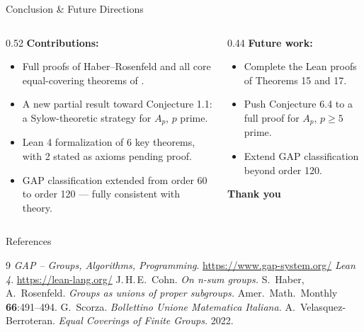 \documentclass[9pt,aspectratio=169]{beamer}
\begin{document}
\begin{frame}{Conclusion \& Future Directions}
\begin{columns}[T]
\begin{column}{0.52\textwidth}
\textbf{Contributions:}
\begin{itemize}
\item Full proofs of Haber--Rosenfeld and all core equal-covering theorems of \cite{vb}.
\item A new partial result toward Conjecture 1.1: a Sylow-theoretic strategy for $A_p$, $p$ prime.
\item Lean 4 formalization of 6 key theorems, with 2 stated as axioms pending proof.
\item GAP classification extended from order 60 to order 120 — fully consistent with theory.
\end{itemize}
\end{column}
\begin{column}{0.44\textwidth}
\textbf{Future work:}
\begin{itemize}
\item Complete the Lean proofs of Theorems 15 and 17.
\item Push Conjecture 6.4 to a full proof for $A_p$, $p\ge 5$ prime.
\item Extend GAP classification beyond order 120.
\end{itemize}
\vspace{10pt}
\begin{center}
{\color{reefMid}\Large\headingfont\bfseries Thank you}
\end{center}
\end{column}
\end{columns}
\end{frame}

\begin{frame}{References}
\footnotesize
\begin{thebibliography}{9}
 \textit{GAP -- Groups, Algorithms, Programming}. \url{https://www.gap-system.org/}
 \textit{Lean 4}. \url{https://lean-lang.org/}
 J.\,H.\,E.\ Cohn. \textit{On n-sum groups.}
 S.\ Haber, A.\ Rosenfeld. \textit{Groups as unions of proper subgroups.} Amer.\ Math.\ Monthly \textbf{66}:491--494.
 G.\ Scorza. \textit{Bollettino Unione Matematica Italiana.}
 A.\ Velasquez-Berroteran. \textit{Equal Coverings of Finite Groups.} 2022.
\end{thebibliography}
\end{frame}
\end{document}

